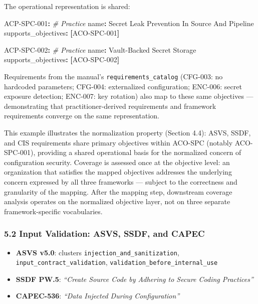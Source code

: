 \documentclass[
]{article}
\newenvironment{Shaded}{}{}
\newcommand{\AttributeTok}[1]{\textcolor[rgb]{0.49,0.56,0.16}{#1}}
\newcommand{\CommentTok}[1]{\textcolor[rgb]{0.38,0.63,0.69}{\textit{#1}}}
\newcommand{\DecValTok}[1]{\textcolor[rgb]{0.25,0.63,0.44}{#1}}
\newcommand{\FunctionTok}[1]{\textcolor[rgb]{0.02,0.16,0.49}{#1}}
\newcommand{\KeywordTok}[1]{\textcolor[rgb]{0.00,0.44,0.13}{\textbf{#1}}}
\providecommand{\tightlist}{%
  \setlength{\itemsep}{0pt}\setlength{\parskip}{0pt}}
\begin{document}
The operational representation is shared:

\begin{Shaded}
\begin{Highlighting}[]
\FunctionTok{ACP{-}SPC{-}001}\KeywordTok{:}\CommentTok{  \# Practice}
\AttributeTok{  }\FunctionTok{name}\KeywordTok{:}\AttributeTok{ Secret Leak Prevention In Source And Pipeline}
\AttributeTok{  }\FunctionTok{supports\_objectives}\KeywordTok{:}\AttributeTok{ }\KeywordTok{[}\AttributeTok{ACO{-}SPC}\DecValTok{{-}001}\KeywordTok{]}

\FunctionTok{ACP{-}SPC{-}002}\KeywordTok{:}\CommentTok{  \# Practice}
\AttributeTok{  }\FunctionTok{name}\KeywordTok{:}\AttributeTok{ Vault{-}Backed Secret Storage}
\AttributeTok{  }\FunctionTok{supports\_objectives}\KeywordTok{:}\AttributeTok{ }\KeywordTok{[}\AttributeTok{ACO{-}SPC}\DecValTok{{-}002}\KeywordTok{]}
\end{Highlighting}
\end{Shaded}

Requirements from the manual's \texttt{requirements\_catalog} (CFG-003:
no hardcoded parameters; CFG-004: externalized configuration; ENC-006:
secret exposure detection; ENC-007: key rotation) also map to these same
objectives --- demonstrating that practitioner-derived requirements and
framework requirements converge on the same representation.

This example illustrates the normalization property (Section 4.4): ASVS,
SSDF, and CIS requirements share primary objectives within ACO-SPC
(notably ACO-SPC-001), providing a shared operational basis for the
normalized concern of configuration security. Coverage is assessed once
at the objective level: an organization that satisfies the mapped
objectives addresses the underlying concern expressed by all three
frameworks --- subject to the correctness and granularity of the
mapping. After the mapping step, downstream coverage analysis operates
on the normalized objective layer, not on three separate
framework-specific vocabularies.

\subsubsection{5.2 Input Validation: ASVS, SSDF, and
CAPEC}\label{input-validation-asvs-ssdf-and-capec}

\begin{itemize}
\tightlist
\item
  \textbf{ASVS v5.0}: clusters \texttt{injection\_and\_sanitization},
  \texttt{input\_contract\_validation},
  \texttt{validation\_before\_internal\_use}
\item
  \textbf{SSDF PW.5}: \emph{``Create Source Code by Adhering to Secure
  Coding Practices''}
\item
  \textbf{CAPEC-536}: \emph{``Data Injected During Configuration''}
\end{itemize}
\end{document}
